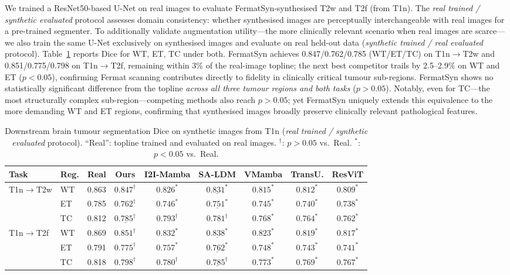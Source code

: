 \documentclass[runningheads]{llncs}
\begin{document}
We trained a ResNet50-based U-Net on real images to evaluate
FermatSyn-synthesised T2w and T2f (from T1n).
The \emph{real trained / synthetic evaluated} protocol assesses
domain consistency: whether synthesised images are perceptually
interchangeable with real images for a pre-trained segmenter.
To additionally validate augmentation utility---the more clinically
relevant scenario when real images are scarce---we also train the
same U-Net exclusively on synthesised images and evaluate on real
held-out data (\emph{synthetic trained / real evaluated} protocol).
Table~\ref{tab:downstream} reports Dice for WT, ET, TC under both.
FermatSyn achieves 0.847/0.762/0.785 (WT/ET/TC) on T1n$\to$T2w and
0.851/0.775/0.798 on T1n$\to$T2f, remaining within 3\% of the
real-image topline; the next best competitor trails by 2.5--2.9\%
on WT and ET ($p{<}0.05$), confirming Fermat scanning contributes
directly to fidelity in clinically critical tumour sub-regions.
FermatSyn shows no statistically significant difference from the
topline \emph{across all three tumour regions and both tasks}
($p{>}0.05$). Notably, even for TC---the most structurally complex
sub-region---competing methods also reach $p{>}0.05$; yet FermatSyn
uniquely extends this equivalence to the more demanding WT and ET
regions, confirming that synthesised images broadly preserve
clinically relevant pathological features.

\begin{table}[t]
\caption{Downstream brain tumour segmentation Dice on synthetic images
  from T1n (\emph{real trained / synthetic evaluated} protocol).
  ``Real'': topline trained and evaluated on real images.
  $^\dagger$: $p{>}0.05$ vs.\ Real.
  $^*$: $p{<}0.05$ vs.\ Real.}
\label{tab:downstream}
\centering
\setlength{\tabcolsep}{2pt}
\fontsize{6.5}{7.5}\selectfont
\begin{tabular}{llccccccc}
\toprule
Task & Reg. & Real & \textbf{Ours} & I2I-Mamba & SA-LDM & VMamba & TransU. & ResViT \\
\midrule
\multirow{3}{*}{\scriptsize T1n$\to$T2w}
  &WT&0.863&$\mathbf{0.847}^\dagger$&$0.826^*$&$\underline{0.831^*}$&$0.815^*$&$0.812^*$&$0.809^*$ \\
  &ET&0.785&$\mathbf{0.762}^\dagger$&$0.746^*$&$\underline{0.751^*}$&$0.745^*$&$0.740^*$&$0.738^*$ \\
  &TC&0.812&$\underline{0.785^\dagger}$&$\mathbf{0.793}^\dagger$&$0.781^\dagger$&$0.768^*$&$0.764^*$&$0.762^*$ \\
\midrule
\multirow{3}{*}{\scriptsize T1n$\to$T2f}
  &WT&0.869&$\mathbf{0.851}^\dagger$&$0.832^*$&$\underline{0.838^*}$&$0.823^*$&$0.819^*$&$0.817^*$ \\
  &ET&0.791&$\mathbf{0.775}^\dagger$&$0.757^*$&$\underline{0.762^*}$&$0.748^*$&$0.743^*$&$0.741^*$ \\
  &TC&0.818&$\mathbf{0.798}^\dagger$&$0.780^\dagger$&$\underline{0.785^\dagger}$&$0.773^*$&$0.769^*$&$0.767^*$ \\
\bottomrule
\end{tabular}
\end{table}
\end{document}
